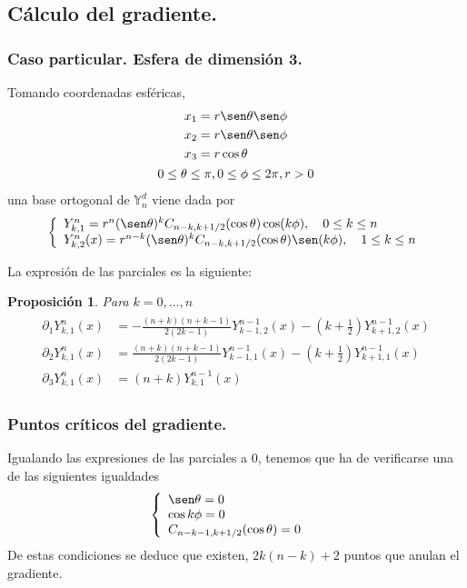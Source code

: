 \documentclass{beamer}
\theoremstyle{plain}
\theoremstyle{definition}
\theoremstyle{plain}
\newtheorem{prop}[thm]{Proposici\'{o}n}
\theoremstyle{definition}
\theoremstyle{remark}
\theoremstyle{definition}
\newcommand{\spharm}{\mathds{Y}^d_n}
\begin{document}
\subsection{Cálculo del gradiente.}
\begin{frame}
		\frametitle{Caso particular. Esfera de dimensión 3.}
		Tomando coordenadas esféricas,
		\begin{gather*}
		\begin{aligned}
		x_1 &= r \sen \theta \sen \phi\\
		x_2 &= r \sen \theta \sen \phi\\
		x_3 &= r \cos \theta\\
		\end{aligned}
		\\
		0\le \theta \le \pi,0\le\phi\le2\pi,r>0
		\end{gather*}
		una base ortogonal de $\spharm$ viene dada por
		\begin{equation*}
		\left\lbrace
		\begin{array}{ll}
		Y^n_ {k,1} = r^n(\sen \theta)^kC_{n-k,k+1/2}(\cos \theta) \cos(k\phi),\quad 0\le k\le n \\
		Y^n_{k,2}(x) = r^{n-k}(\sen\theta)^kC_{n-k,k+1/2}(\cos\theta)\sen(k\phi), \quad 1\le k\le n
		\end{array}
		\right.
		\end{equation*}
\end{frame}
\begin{frame}
La expresión de las parciales es la siguiente:
	\begin{prop} Para $k=0,...,n$
		\begin{gather*} 
		\begin{aligned}
		\partial_1Y^{n}_{k,1}(x) &= -\frac{(n+k)(n+k-1)}{2(2k-1)}Y^{n-1}_{k-1,2}(x)-(k+\frac{1}{2})Y^{n-1}_ {k+1,2}(x) \\
		\partial_2Y^{n}_{k,1}(x) &= \frac{(n+k)(n+k-1)}{2(2k-1)}Y^{n-1}_{k-1,1}(x)-(k+\frac{1}{2})Y^{n-1}_ {k+1,1}(x) \\
		\partial_3 Y_{k,1}^{n}(x) &=(n+k)Y_{k,1}^{n-1}(x)
		\end{aligned}
		\end{gather*}

	\end{prop}
\end{frame}
\begin{frame}
	\frametitle{Puntos críticos del gradiente.}

	Igualando las expresiones de las parciales a 0, tenemos que ha de verificarse una de las siguientes igualdades
	\begin{gather*}
	\left\{
	\begin{array}{ll}
	\sen \theta= 0 \\
	\cos k\phi = 0 &\\
	C_{n-k-1,k+1/2}(\cos \theta) = 0
	\end{array}
	\right.
	\end{gather*}
	De estas condiciones se deduce que existen, $2k(n-k)+2$ puntos que anulan el gradiente.
\end{frame}
\end{document}
